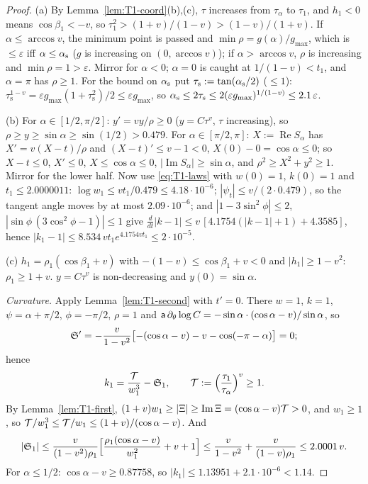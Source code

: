 \begin{proof}
(a) By Lemma~\ref{lem:T1-coord}(b),(c), $\tau$ increases from $\tau_\alpha$ to $\tau_1$, and $h_1<0$ means $\cos\beta_1<-v$, so
$\tau_1^2>(1+v)/(1-v)>(1-v)/(1+v)$. If $\alpha\le\arccos v$, the minimum point is passed and $\min\rho=g(\alpha)/g_{\max}$, which is
$\le\varepsilon$ iff $\alpha\le\alpha_{\mathrm s}$ ($g$ is increasing on $(0,\arccos v)$); if $\alpha>\arccos v$, $\rho$ is increasing and
$\min\rho=1>\varepsilon$. Mirror for $\alpha<0$; $\alpha=0$ is caught at $1/(1-v)<t_1$, and $\alpha=\pi$ has $\rho\ge1$. For the bound on
$\alpha_{\mathrm s}$ put $\tau_{\mathrm s}:=\tan(\alpha_{\mathrm s}/2)$ ($\le1$): $\tau_{\mathrm s}^{1-v}=\varepsilon g_{\max}(1+\tau_{\mathrm s}^2)/2\le\varepsilon g_{\max}$, so
$\alpha_{\mathrm s}\le2\tau_{\mathrm s}\le2(\varepsilon g_{\max})^{1/(1-v)}\le2.1\,\varepsilon$.

(b) For $\alpha\in[1/2,\pi/2]$: $y'=vy/\rho\ge0$ ($y=C\tau^v$, $\tau$ increasing), so $\rho\ge y\ge\sin\alpha\ge\sin(1/2)>0.479$. For
$\alpha\in[\pi/2,\pi]$: $X:=\operatorname{Re}S_\alpha$ has $X'=v(X-t)/\rho$ and $(X-t)'\le v-1<0$, $X(0)-0=\cos\alpha\le0$; so $X-t\le0$,
$X'\le0$, $X\le\cos\alpha\le0$, $|\operatorname{Im}S_\alpha|\ge\sin\alpha$, and $\rho^2\ge X^2+y^2\ge1$. Mirror for the lower half. Now use
\eqref{eq:T1-laws} with $w(0)=1$, $k(0)=1$ and $t_1\le2.0000011$: $\log w_1\le vt_1/0.479\le4.18\cdot10^{-6}$;
$|\psi_t|\le v/(2\cdot0.479)$, so the tangent angle moves by at most $2.09\cdot10^{-6}$; and $|1-3\sin^2\!\phi|\le2$,
$|\sin\phi\,(3\cos^2\!\phi-1)|\le1$ give $\frac d{dt}|k-1|\le v\,[4.1754(|k-1|+1)+4.3585]$, hence
$|k_1-1|\le8.534\,vt_1e^{4.1754vt_1}\le2\cdot10^{-5}$.

(c) $h_1=\rho_1(\cos\beta_1+v)$ with $-(1-v)\le\cos\beta_1+v<0$ and $|h_1|\ge1-v^2$: $\rho_1\ge1+v$. $y=C\tau^v$ is non-decreasing and
$y(0)=\sin\alpha$.

\emph{Curvature.} Apply Lemma~\ref{lem:T1-second} with $t'=0$. There $w=1$, $k=1$, $\psi=\alpha+\pi/2$, $\phi=-\pi/2$, $\rho=1$ and
$\mathsf a\,\partial_\theta\log C=-\sin\alpha\cdot(\cos\alpha-v)/\sin\alpha$, so
\[
\mathfrak S'=-\frac v{1-v^2}\bigl[-(\cos\alpha-v)-v-\cos(-\pi-\alpha)\bigr]=0 ;
\]
hence
\begin{equation}\label{eq:T1-k1}
k_1=\frac{\mathcal T}{w_1^3}-\mathfrak S_1,\qquad\mathcal T:=\Bigl(\frac{\tau_1}{\tau_\alpha}\Bigr)^v\ge1 .
\end{equation}
By Lemma~\ref{lem:T1-first}, $(1+v)w_1\ge|\Xi|\ge\operatorname{Im}\Xi=(\cos\alpha-v)\mathcal T>0$, and $w_1\ge1$, so
$\mathcal T/w_1^3\le\mathcal T/w_1\le(1+v)/(\cos\alpha-v)$. And
\[
|\mathfrak S_1|\le\frac v{(1-v^2)\rho_1}\Bigl[\frac{\rho_1(\cos\alpha-v)}{w_1^2}+v+1\Bigr]\le\frac v{1-v^2}+\frac v{(1-v)\rho_1}\le2.0001\,v .
\]
For $\alpha\le1/2$: $\cos\alpha-v\ge0.87758$, so $|k_1|\le1.13951+2.1\cdot10^{-6}<1.14$.


\end{proof}
